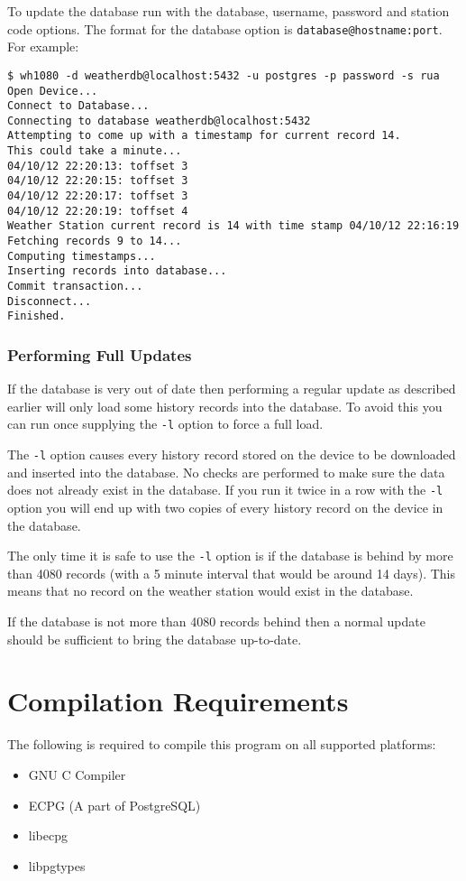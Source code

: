 \documentclass[a4paper,10pt,draft]{book}
\begin{document}
To update the database run with the database, username, password and station code options. The format for the database option is \verb|database@hostname:port|. For example:
\begin{verbatim}
$ wh1080 -d weatherdb@localhost:5432 -u postgres -p password -s rua
Open Device...
Connect to Database...
Connecting to database weatherdb@localhost:5432
Attempting to come up with a timestamp for current record 14.
This could take a minute...
04/10/12 22:20:13: toffset 3
04/10/12 22:20:15: toffset 3
04/10/12 22:20:17: toffset 3
04/10/12 22:20:19: toffset 4
Weather Station current record is 14 with time stamp 04/10/12 22:16:19
Fetching records 9 to 14...
Computing timestamps...
Inserting records into database...
Commit transaction...
Disconnect...
Finished.
\end{verbatim}

\subsubsection{Performing Full Updates}
If the database is very out of date then performing a regular update as described earlier will only load some history records into the database. To avoid this you can run once supplying the \verb|-l| option to force a full load.

The \verb|-l| option causes every history record stored on the device to be downloaded and inserted into the database. No checks are performed to make sure the data does not already exist in the database. If you run it twice in a row with the \verb|-l| option you will end up with two copies of every history record on the device in the database.

The only time it is safe to use the \verb|-l| option is if the database is behind by more than 4080 records (with a 5 minute interval that would be around 14 days). This means that no record on the weather station would exist in the database.

If the database is not more than 4080 records behind then a normal update should be sufficient to bring the database up-to-date.

\section{Compilation Requirements}
The following is required to compile this program on all supported platforms:
\begin{itemize}
\item GNU C Compiler
\item ECPG (A part of PostgreSQL)
\item libecpg
\item libpgtypes
\end{itemize}
\end{document}
